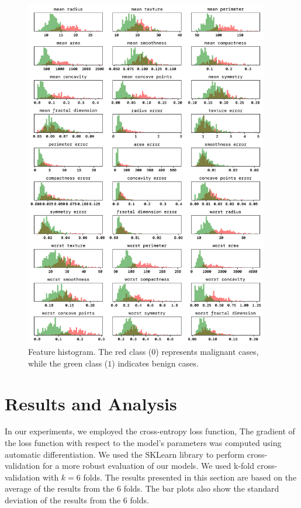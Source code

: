\documentclass[twoside,11pt]{report}
\begin{document}
    \begin{figure}
        \begin{center}
            \includegraphics[width=0.95\textwidth]{../runsAndFigures/feature_histogram.png}
        \end{center}
        \caption{Feature histogram. The red class ($0$) represents malignant cases, while the green class 
        ($1$) indicates benign cases.}\label{fig:feature_histogram}
    \end{figure}


\clearpage

\section{Results and Analysis}
\label{sec:resultsdiscussion}

    In our experiments, we employed the cross-entropy loss function, The gradient of the loss function 
    with respect to the model's parameters was computed using automatic differentiation. 
    We used the SKLearn\cite{scikit-learn}
    library to perform cross-validation for a more robust evaluation of our models.
    We used k-fold cross-validation with $k=6$ folds. The results presented in this section are based on
    the average of the results from the 6 folds. The bar plots also show the standard deviation of the
    results from the 6 folds.
\end{document}

